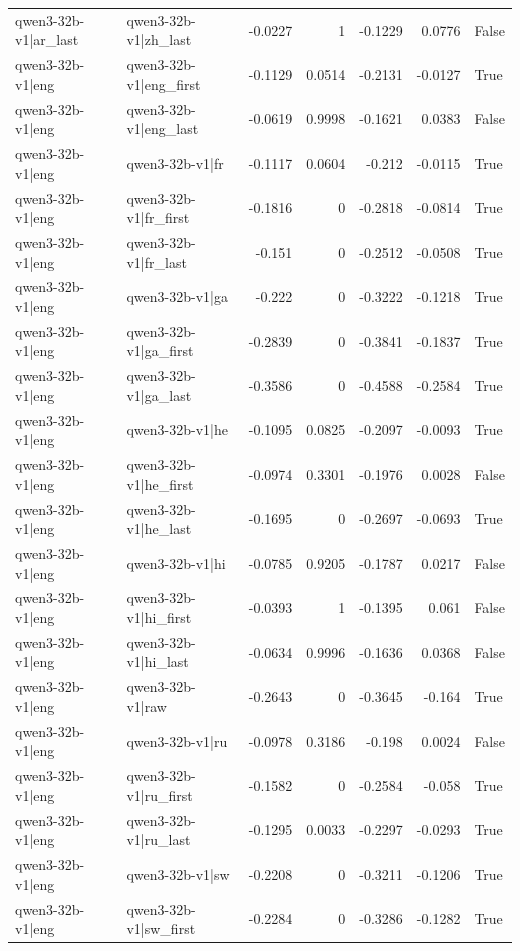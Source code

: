 \begin{table}
\begin{tabular}{l l r r r r l}
qwen3-32b-v1|ar_last & qwen3-32b-v1|zh_last & -0.0227 & 1 & -0.1229 & 0.0776 & False \\
qwen3-32b-v1|eng & qwen3-32b-v1|eng_first & -0.1129 & 0.0514 & -0.2131 & -0.0127 & True \\
qwen3-32b-v1|eng & qwen3-32b-v1|eng_last & -0.0619 & 0.9998 & -0.1621 & 0.0383 & False \\
qwen3-32b-v1|eng & qwen3-32b-v1|fr & -0.1117 & 0.0604 & -0.212 & -0.0115 & True \\
qwen3-32b-v1|eng & qwen3-32b-v1|fr_first & -0.1816 & 0 & -0.2818 & -0.0814 & True \\
qwen3-32b-v1|eng & qwen3-32b-v1|fr_last & -0.151 & 0 & -0.2512 & -0.0508 & True \\
qwen3-32b-v1|eng & qwen3-32b-v1|ga & -0.222 & 0 & -0.3222 & -0.1218 & True \\
qwen3-32b-v1|eng & qwen3-32b-v1|ga_first & -0.2839 & 0 & -0.3841 & -0.1837 & True \\
qwen3-32b-v1|eng & qwen3-32b-v1|ga_last & -0.3586 & 0 & -0.4588 & -0.2584 & True \\
qwen3-32b-v1|eng & qwen3-32b-v1|he & -0.1095 & 0.0825 & -0.2097 & -0.0093 & True \\
qwen3-32b-v1|eng & qwen3-32b-v1|he_first & -0.0974 & 0.3301 & -0.1976 & 0.0028 & False \\
qwen3-32b-v1|eng & qwen3-32b-v1|he_last & -0.1695 & 0 & -0.2697 & -0.0693 & True \\
qwen3-32b-v1|eng & qwen3-32b-v1|hi & -0.0785 & 0.9205 & -0.1787 & 0.0217 & False \\
qwen3-32b-v1|eng & qwen3-32b-v1|hi_first & -0.0393 & 1 & -0.1395 & 0.061 & False \\
qwen3-32b-v1|eng & qwen3-32b-v1|hi_last & -0.0634 & 0.9996 & -0.1636 & 0.0368 & False \\
qwen3-32b-v1|eng & qwen3-32b-v1|raw & -0.2643 & 0 & -0.3645 & -0.164 & True \\
qwen3-32b-v1|eng & qwen3-32b-v1|ru & -0.0978 & 0.3186 & -0.198 & 0.0024 & False \\
qwen3-32b-v1|eng & qwen3-32b-v1|ru_first & -0.1582 & 0 & -0.2584 & -0.058 & True \\
qwen3-32b-v1|eng & qwen3-32b-v1|ru_last & -0.1295 & 0.0033 & -0.2297 & -0.0293 & True \\
qwen3-32b-v1|eng & qwen3-32b-v1|sw & -0.2208 & 0 & -0.3211 & -0.1206 & True \\
qwen3-32b-v1|eng & qwen3-32b-v1|sw_first & -0.2284 & 0 & -0.3286 & -0.1282 & True \\

\end{tabular}
\end{table}
